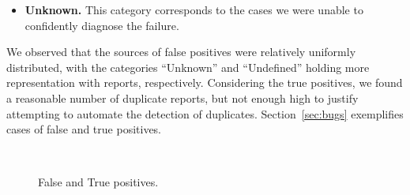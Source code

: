 \documentclass[10pt,conference,anonymous]{IEEEtran}
\begin{document}
\begin{itemize}
  \item \textbf{Unknown.} This category corresponds to the cases we
    were unable to confidently diagnose the failure.

\end{itemize}  

We observed that the sources of false positives were relatively
uniformly distributed, with the categories ``Unknown'' and
``Undefined'' holding more representation with  reports,
respectively. Considering the true positives, we found a reasonable
number of duplicate reports, but not enough high to justify attempting
to automate the detection of duplicates. Section~\ref{sec:bugs}
exemplifies cases of false and true positives.

\begin{figure}[h]
  \centering
  \label{1a}\hfill
  \label{1b}\\
  \caption{\label{fig:piecharts-transplantation}False and True positives.}
\end{figure}
\end{document}
